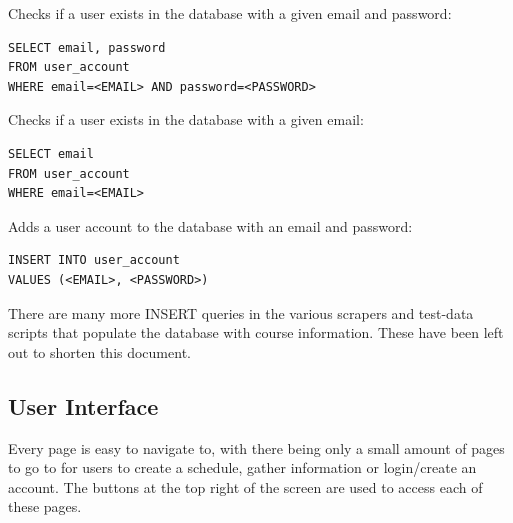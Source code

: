 \documentclass[twoside=false,a4paper,11pt]{article}
\theoremstyle{mytheor}
\begin{document}
Checks if a user exists in the database with a given email and password:
\begin{lstlisting}
SELECT email, password
FROM user_account
WHERE email=<EMAIL> AND password=<PASSWORD>
\end{lstlisting}

Checks if a user exists in the database with a given email:
\begin{lstlisting}
SELECT email
FROM user_account
WHERE email=<EMAIL>
\end{lstlisting}

Adds a user account to the database with an email and password:
\begin{lstlisting}
INSERT INTO user_account
VALUES (<EMAIL>, <PASSWORD>)
\end{lstlisting}

There are many more INSERT queries in the various scrapers and test-data scripts that populate the database with course information. These have been left out to shorten this document.

\pagebreak
\subsection*{User Interface}

Every page is easy to navigate to, with there being only a small amount of pages to go to for users to create a schedule, gather information or login/create an account. The buttons at the top right of the screen are used to access each of these pages.
\end{document}
